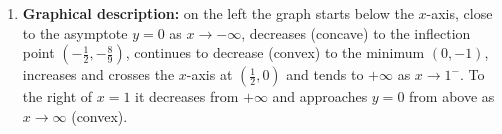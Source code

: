 \begin{solution}
\begin{enumerate}
  \item \textbf{Graphical description:} on the left the graph starts below the $x$-axis, close to the asymptote $y=0$ as $x\to-\infty$, decreases (concave) to the inflection point $(-\frac12,-\frac89)$, continues to decrease (convex) to the minimum $(0,-1)$, increases and crosses the $x$-axis at $(\frac12,0)$ and tends to $+\infty$ as $x\to1^-$. To the right of $x=1$ it decreases from $+\infty$ and approaches $y=0$ from above as $x\to\infty$ (convex).
\end{enumerate}
\end{solution}
